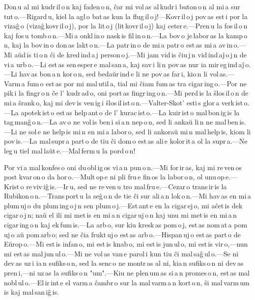 
Don\,u al mi kudr\,il\,o\,n kaj faden\,o\,n, ĉar mi vol\,as al\,kudr\,i buton\,o\,n al mi\,a sur\,tut\,o.---Rigard\,u, kiel la agl\,o bat\,as kun la flug\,il\,o\,j!---Kovr\,il\,o\,j pov\,as est\,i por la vizaĝ\,o (vizaĝ\,kovr\,il\,o\,j), por la lit\,o\,j (lit\,kovr\,il\,o\,j) kaj ceter\,e.---Pren\,u la fos\,il\,o\,n kaj fos\,u tomb\,o\,n.---Mi\,a onkl\,in\,o nask\,is fil\,in\,o\,n.---La bov\,o je\,labor\,as la kamp\,o\,n, kaj la bov\,in\,o don\,as lakt\,o\,n.---La patr\,in\,o de mi\,a patr\,o est\,as mi\,a av\,in\,o.---Mi aŭd\,is ti\,o\,n ĉi de kred\,ind\,a\,j person\,o\,j.---Mi jam vid\,is ĉiu\,j\,n vid\,ind\,aĵ\,o\,j\,n de vi\,a urb\,o.---Li est\,as sen\,esper\,e mal\,san\,a, kaj sav\,i li\,n pov\,as nur ia mir\,eg\,ind\,aĵ\,o.---Li hav\,as bon\,a\,n kor\,o\,n, sed bedaŭr\,ind\,e li ne pov\,as far\,i, kio\,n li vol\,as.---Varm\,a fum\,o est\,as por mi mal\,util\,a, tial mi ĉiam fum\,as tra cigar\,ing\,o.---Por ne pik\,i la fingr\,o\,n ĉe l' kudr\,ad\,o, oni port\,as fingr\,ing\,o\,n.---Mi perd\,is la ŝlos\,il\,o\,n de mi\,a ŝrank\,o, kaj mi dev\,is ven\,ig\,i ŝlos\,il\,ist\,o\,n.---Valter-Skot' esti\,s glor\,a verk\,ist\,o.---La apotek\,ist\,o est\,as help\,ant\,o de l' kurac\,ist\,o.---La kuir\,ist\,o mal\,bon\,ig\,is la tag\,manĝ\,o\,n.---La av\,o ne vol\,is ben\,i si\,a\,n nep\,o\,n, sed li ankaŭ li\,n ne mal\,ben\,is.---Li ne sol\,e ne help\,is mi\,n en mi\,a labor\,o, sed li ankoraŭ mi\,n mal\,help\,is, kiom li pov\,is.---La mal\,supr\,a part\,o de tiu ĉi dom\,o est\,as ali\,e kolor\,it\,a ol la supr\,a.---Ne leg\,u tiel mal\,laŭt\,e.---Mal\,ferm\,u la pord\,o\,n! 



Por vi\,a mal\,konfes\,o oni du\,obl\,ig\,os vi\,a\,n pun\,o\,n.---Mi for\,ir\,as, kaj mi re\,ven\,os post kvar\,on\,o da hor\,o.---Mult\,op\,e ni pli fru\,e fin\,os la labor\,o\,n, ol unu\,op\,e.---Krist\,o re\,viv\,iĝ\,is.---Ir\,u, sed ne re\,ven\,u tro mal\,fru\,e.---Cezar\,o trans\,ir\,is la Rubikon\,o\,n.---Trans\,port\,u la seĝ\,o\,n de tie ĉi sur ali\,a\,n lok\,o\,n.---Mi hav\,as en mi\,a plum\,uj\,o du plum\,ing\,o\,j\,n sen plum\,o\,j.---Est\,ant\,e en la cigar\,ej\,o, mi aĉet\,is dek cigar\,o\,j\,n; naŭ el ili mi met\,is en mi\,a\,n cigar\,uj\,o\,n kaj unu mi met\,is en mi\,a\,n cigar\,ing\,o\,n kaj ek\,fum\,is.---La arb\,o, sur kiu kresk\,as pom\,o\,j, est\,as nom\,at\,a pom\,uj\,o aŭ pom\,arb\,o; sed ne ĉia frukt\,uj\,o est\,as arb\,o.---Hispan\,uj\,o est\,as part\,o de Eŭrop\,o.---Mi est\,is infan\,o, mi est\,is knab\,o, mi est\,is jun\,ul\,o, mi est\,is vir\,o,---nun mi est\,as mal\,jun\,ul\,o.---Mi ne vol\,as van\,e parol\,i kun tiu ĉi mal\,saĝ\,ul\,o.---Se ni dev\,as uz\,i ia\,n sufiks\,o\,n, sed la senc\,o ne montr\,as al ni, kia\,n sufiks\,o\,n ni dev\,as pren\,i,---ni uz\,as la sufiks\,o\,n "um".---Kiu ne plen\,um\,as si\,a\,n promes\,o\,n, est\,as mal\,nobl\,ul\,o.---El\,ir\,int\,e el varm\,a ĉambr\,o sur la mal\,varm\,a\,n kort\,o\,n, ŝi mal\,varm\,um\,is kaj mal\,san\,iĝ\,is.


